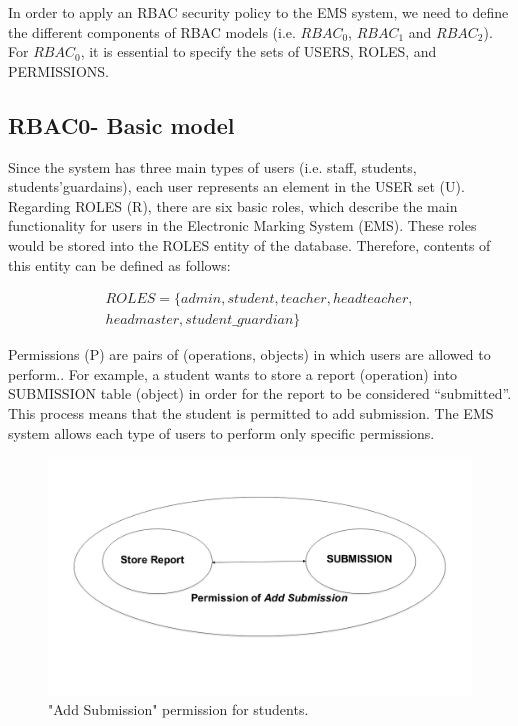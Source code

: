 In order to apply an RBAC security policy to the EMS system, we need to define the different components of RBAC models (i.e. $RBAC_0$, $RBAC_1$ and $RBAC_2$).  For $RBAC_0$, it is essential to specify the sets of USERS, ROLES, and PERMISSIONS.

\subsection{RBAC0- Basic model}
Since the system has three main types of users (i.e. staff, students, students’guardains), each user represents an element in the USER set (U).  Regarding ROLES (R), there are six basic roles, which describe the main functionality for users in the Electronic Marking System (EMS).  These roles would be stored into the ROLES entity of the database.  Therefore, contents of this entity can be defined as follows:

\begin{align*}
ROLES = \{admin, student, teacher, headteacher, \\headmaster, student\_guardian\}
\end{align*}


Permissions (P) are pairs of (operations, objects) in which users are allowed to perform..  For example, a student wants to store a report (operation) into SUBMISSION table (object) in order for the report to be considered “submitted”.  This process means that the student is permitted to add submission.  The EMS system allows each type of users to perform only specific permissions. 

\begin{figure}[bht]
\centering
\includegraphics[scale=0.26]{addsubmission.png}
\caption{"Add Submission" permission for students.}
\label{fig:permstud}
\end{figure}

